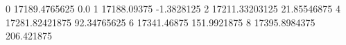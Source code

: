 0 17189.4765625 0.0
1 17188.09375 -1.3828125
2 17211.33203125 21.85546875
4 17281.82421875 92.34765625
6 17341.46875 151.9921875
8 17395.8984375 206.421875
